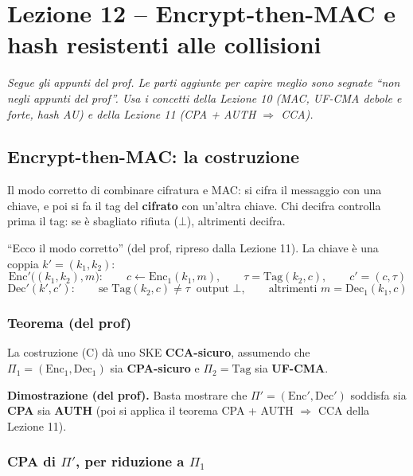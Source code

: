\chapter{Lezione 12 -- Encrypt-then-MAC e hash resistenti alle collisioni}

\emph{Segue gli appunti del prof. Le parti aggiunte per capire meglio sono segnate ``non negli appunti del prof''. Usa i concetti della Lezione 10 (MAC, UF-CMA debole e forte, hash AU) e della Lezione 11 (CPA + AUTH \(\Rightarrow\) CCA).}

\section{Encrypt-then-MAC: la costruzione}

\begin{inbreve}
Il modo corretto di combinare cifratura e MAC: si cifra il messaggio con una chiave, e poi si fa il tag del \textbf{cifrato} con un'altra chiave. Chi decifra controlla prima il tag: se è sbagliato rifiuta (\(\bot\)), altrimenti decifra.
\end{inbreve}

``Ecco il modo corretto'' (del prof, ripreso dalla Lezione 11). La chiave è una coppia \(k' = (k_1, k_2)\):
\[
\text{Enc}'\big((k_1, k_2), m\big): \qquad c \leftarrow \text{Enc}_1(k_1, m), \qquad \tau = \text{Tag}(k_2, c), \qquad c' = (c, \tau)
\]
\[
\text{Dec}'(k', c'): \qquad \text{se } \text{Tag}(k_2, c) \ne \tau \ \text{ output } \bot, \qquad \text{altrimenti } m = \text{Dec}_1(k_1, c)
\]

\subsection{Teorema (del prof)}

La costruzione (C) dà uno SKE \textbf{CCA-sicuro}, assumendo che \(\Pi_1 = (\text{Enc}_1, \text{Dec}_1)\) sia \textbf{CPA-sicuro} e \(\Pi_2 = \text{Tag}\) sia \textbf{UF-CMA}.

\textbf{Dimostrazione (del prof).} Basta mostrare che \(\Pi' = (\text{Enc}', \text{Dec}')\) soddisfa sia \textbf{CPA} sia \textbf{AUTH} (poi si applica il teorema CPA + AUTH \(\Rightarrow\) CCA della Lezione 11).

\subsection{CPA di \texorpdfstring{\(\Pi'\)}{Pi'}, per riduzione a \texorpdfstring{\(\Pi_1\)}{Pi1}}

